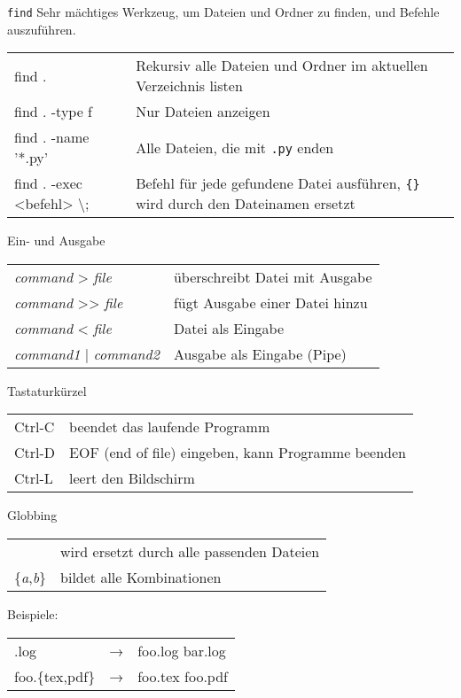 \begin{frame}[fragile]{\texttt{find}}
  Sehr mächtiges Werkzeug, um Dateien und Ordner zu finden, und Befehle auszuführen.

  \begin{tabu}{>{\ttfamily}l X[,L]}
    find . & Rekursiv alle Dateien und Ordner im aktuellen Verzeichnis listen \\
    find . -type f & Nur Dateien anzeigen \\
    find . -name '*.py' & Alle Dateien, die mit \texttt{.py} enden \\
    find . -exec <befehl> \textbackslash{}; & Befehl für jede gefundene Datei ausführen, \texttt{\{\}} wird durch den Dateinamen ersetzt \\
  \end{tabu}
\end{frame}

\begin{frame}{Ein- und Ausgabe}
  \begin{tabu}{>{\ttfamily}l X[,L]}
    \textit{command} > \textit{file}      & überschreibt Datei mit Ausgabe \\
    \textit{command} >> \textit{file}     & fügt Ausgabe einer Datei hinzu \\
    \textit{command} < \textit{file}      & Datei als Eingabe \\
    \textit{command1} | \textit{command2} & Ausgabe als Eingabe (Pipe)
  \end{tabu}
\end{frame}



\begin{frame}{Tastaturkürzel}
  \begin{tabu}{>{\ttfamily}l X[,L]}
    Ctrl-C & beendet das laufende Programm \\
    Ctrl-D & EOF (end of file) eingeben, kann Programme beenden \\
    Ctrl-L & leert den Bildschirm
  \end{tabu}
\end{frame}

\begin{frame}{Globbing}
  \begin{tabu}{>{\ttfamily}l X[,L]}
    *                         & wird ersetzt durch alle passenden Dateien \\
    \{\textit{a},\textit{b}\} & bildet alle Kombinationen
  \end{tabu}

  \vspace{2cm}
  Beispiele:\\[10pt]
  \begin{tabu}{>{\ttfamily}l c >{\ttfamily}l}
    *.log           & → & foo.log bar.log \\
    foo.\{tex,pdf\} & → & foo.tex foo.pdf
  \end{tabu}
\end{frame}

